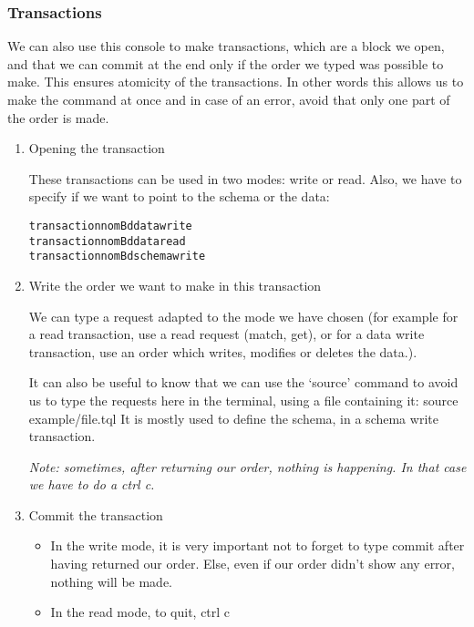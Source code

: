\documentclass{article}
\begin{document}
  \subsubsection{Transactions}
We can also use this console to make transactions, which are a block we open, and that we can commit at the end only if the order we typed was possible to make. This ensures atomicity of the transactions. In other words this allows us to make the command at once and in case of an error, avoid that only one part of the order is made.

\begin{enumerate}
\item Opening  the transaction

These transactions can be used in two modes: write or read. Also, we have to specify if we want to point to the schema or the data:

\begin{alltt}
transaction nomBd data write
transaction nomBd data read
transaction nomBd schema write
\end{alltt}       

\item Write the order we want to make in this transaction

We can type a request adapted to the mode we have chosen (for example for a read transaction, use a read request (match, get), or for a data write transaction, use an order which writes, modifies or deletes the data.).

It can also be useful to know that we can use the ‘source’ command to avoid us to type the requests here in the terminal, using a file containing it: 
        source example/file.tql
It is mostly used to define the schema, in a schema write transaction.

\emph{Note: sometimes, after returning our order, nothing is happening. In that case we have to do a ctrl c.}

\item Commit the transaction
\begin{itemize}
\item In the write mode, it is very important not to forget to type commit after having returned our order. Else, even if our order didn’t show any error, nothing will be made.
\item In the read mode, to quit, ctrl c
\end{itemize}

\end{enumerate}
\end{document}
